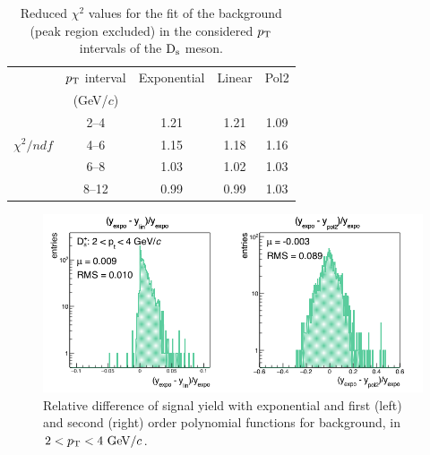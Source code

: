 \begin{table}[!t]
\centering
\vspace{0.5cm}
\begin{tabular}{|c|c|c|c|c|} 
\hline \rule{0pt}{2.7ex}
 & $p_{\rm T}$ interval & Exponential & Linear & Pol2 \\ 
 &(GeV/$c$) & & &  \\ 
\hline \rule{0pt}{2.7ex}
           &\phantom{0}2--4\phantom{0} & 1.21 & 1.21 & 1.09\\
           $\chi^2/ndf$ &\phantom{0}4--6\phantom{0} & 1.15 & 1.18 & 1.16\\
          &\phantom{0}6--8\phantom{0} & 1.03 & 1.02 & 1.03\\
           &\phantom{0}8--12 & 0.99 & 0.99  & 1.03\\
\hline
\end{tabular}
\caption{Reduced $\chi^2$ values for the fit of the background (peak region excluded) in the
considered $p_{\rm T}$ intervals of the ${\rm D_s}$ meson.} 
\label{tab:chi2bkg}
\end{table}

\begin{figure}[!hb]
\begin{center}
 \includegraphics[width=.70\textwidth]{FigCap4/studyBkg_Free_pt0.png}
\caption{Relative difference of signal yield with exponential and first (left) and second (right) 
order polynomial functions for background, in $2 < p_{\rm T} < 4 ~\mathrm{GeV}/c$.}             
\label{fig:diffBkgPt0}
\end{center}
\end{figure}


